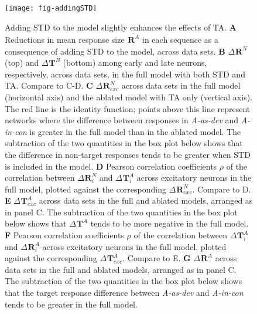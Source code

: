 \documentclass[9pt,lineno,onehalfspacing]{elife}
\newcommand{\dev}{\textit{A-as-dev}}
\newcommand{\msc}{\textit{A-in-con}}
\newcommand{\R}[3][]{{}^{#1}_{}\boldsymbol R^{#2}_{#3}}
\newcommand{\T}[3][]{{}^{#1}_{}\boldsymbol T^{#2}_{#3}}
\newcommand{\mean}[1]{\overline{#1}}
\begin{document}
\begin{figure}
    \texttt{[image: fig-addingSTD]}
    \caption{%
        Adding STD to the model slightly enhances the effects of TA.
        \textbf{A} Reductions in mean response size $\mean{\R{A}{}}$ in each sequence as a consequence of adding STD to the model, across data sets.
        \textbf{B} $\Delta \R{N}{}$ (top) and $\Delta \T{B}{}$ (bottom) among early and late neurons, respectively, across data sets, in the full model with both STD and TA. Compare to C-D.
        \textbf{C} $\Delta \R{N}{exc}$ across data sets in the full model (horizontal axis) and the ablated model with TA only (vertical axis). The red line is the identity function; points above this line represent networks where the difference between responses in \dev{} and \msc{} is greater in the full model than in the ablated model. The subtraction of the two quantities in the box plot below shows that the difference in non-target responses tends to be greater when STD is included in the model.
        \textbf{D} Pearson correlation coefficients $\rho$ of the correlation between $\Delta \R{N}{i}$ and $\Delta \T{A}{i}$ across excitatory neurons in the full model, plotted against the corresponding $\Delta \R{N}{exc}$. Compare to D.
        \textbf{E} $\Delta \T{A}{exc}$ across data sets in the full and ablated models, arranged as in panel C. The subtraction of the two quantities in the box plot below shows that $\Delta \T{A}{}$ tends to be more negative in the full model.
        \textbf{F} Pearson correlation coefficients $\rho$ of the correlation between $\Delta \T{A}{i}$ and $\Delta \R{A}{i}$ across excitatory neurons in the full model, plotted against the corresponding $\Delta \T{A}{exc}$. Compare to E.
        \textbf{G} $\Delta \R{A}{}$ across data sets in the full and ablated models, arranged as in panel C. The subtraction of the two quantities in the box plot below shows that the target response difference between \dev{} and \msc{} tends to be greater in the full model.
    }
    \label{fig:addingSTD}
\end{figure}
\end{document}
